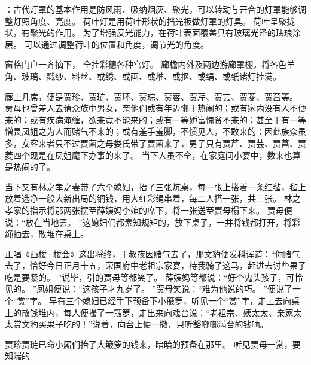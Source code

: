 {{\begin{figure}[H]
\begin{subfigure}[H]{0.45\textwidth}
     \end{subfigure}  
\end{figure}
}：古代灯罩的基本作用是防风雨、吸纳烟灰、聚光，可以转动与开合的灯罩能够调整灯照角度、亮度。
荷叶灯是用荷叶形状的挡光板做灯罩的灯具。
荷叶呈聚拢状，有聚光的作用。
为了增强反光能力，在荷叶表面覆盖具有玻璃光泽的珐琅涂层。
可以通过调整荷叶的位置和角度，调节光的角度。
}窗格门户一齐摘下，
全挂彩穗各种宫灯。
廊檐内外及两边游廊罩棚，将各色羊角、玻璃、戳纱、料丝、或绣、或画、或堆、或抠、或绢、或纸诸灯挂满。
\par
廊上几席，便是贾珍、贾琏、贾环、贾琮、贾蓉、贾芹、贾芸、贾菱、贾菖等。
贾母也曾差人去请众族中男女，奈他们或有年迈懒于热闹的；或有家内没有人不便来的；或有疾病淹缠，欲来竟不能来的；或有一等妒富愧贫不来的；甚至于有一等憎畏凤姐之为人而赌气不来的；或有羞手羞脚，不惯见人，不敢来的：因此族众虽多，女客来者只不过贾菌之母娄氏带了贾菌来了，男子只有贾芹、贾芸、贾菖、贾菱四个现是在凤姐麾下办事的来了。
当下人虽不全，在家庭间小宴中，数来也算是热闹的了。
\par
当下又有林之孝之妻带了六个媳妇，抬了三张炕桌，每一张上搭着一条红毡，毡上放着选净一般大新出局的铜钱，用大红彩绳串着，每二人搭一张，共三张。
林之孝家的指示将那两张摆至薛姨妈李婶的席下，将一张送至贾母榻下来。
贾母便说：“放在当地罢。
”这媳妇们都素知规矩的，放下桌子，一并将钱都打开，将彩绳抽去，散堆在桌上。
\par
正唱《西楼·楼会》这出将终，于叔夜因赌气去了，那文豹便发科诨道：“你赌气去了，恰好今日正月十五，荣国府中老祖宗家宴，待我骑了这马，赶进去讨些果子吃是要紧的。
”说毕，引的贾母等都笑了。
薛姨妈等都说：“好个鬼头孩子，可怜见的。
”凤姐便说：“这孩子才九岁了。
”贾母笑说：“难为他说的巧。
”便说了一个“赏”字。
早有三个媳妇已经手下预备下小簸箩，听见一个“赏”字，走上去向桌上的散钱堆内，每人便撮了一簸箩，走出来向戏台说：“老祖宗、姨太太、亲家太太赏文豹买果子吃的！”说着，向台上便一撒，只听豁啷啷满台的钱响。
\par
贾珍贾琏已命小厮们抬了大簸箩的钱来，暗暗的预备在那里。
听见贾母一赏，要知端的——\par
